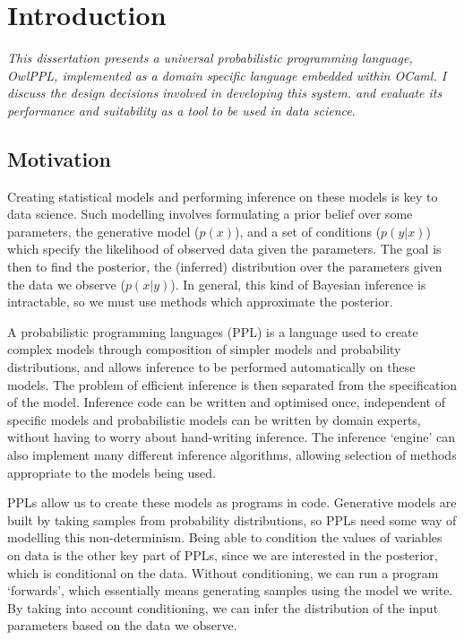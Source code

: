 \chapter{Introduction}

\textit{This dissertation presents a universal probabilistic programming language, OwlPPL, implemented as a domain specific language embedded within OCaml. I discuss the design decisions involved in developing this system. and evaluate its performance and suitability as a tool to be used in data science}.

\section{Motivation}
Creating statistical models and performing inference on these models is key to data science. Such modelling involves formulating a prior belief over some parameters, the generative model ($p(x)$), and a set of conditions ($p(y|x)$) which specify the likelihood of observed data given the parameters. The goal is then to find the posterior, the (inferred) distribution over the parameters given the data we observe ($p(x|y)$). In general, this kind of Bayesian inference is intractable, so we must use methods which approximate the posterior.

A probabilistic programming languages (PPL) is a language used to create complex models through composition of simpler models and probability distributions, and allows inference to be performed automatically on these models. The problem of efficient inference is then separated from the specification of the model. Inference code can be written and optimised once, independent of specific models and probabilistic models can be written by domain experts, without having to worry about hand-writing inference. The inference `engine' can also implement many different inference algorithms, allowing selection of methods appropriate to the models being used.

PPLs allow us to create these models as programs in code. Generative models are built by taking samples from probability distributions, so PPLs need some way of modelling this non-determinism. Being able to condition the values of variables on data is the other key part of PPLs, since we are interested in the posterior, which is conditional on the data. Without conditioning, we can run a program `forwards', which essentially means generating samples using the model we write. By taking into account conditioning, we can infer the distribution of the input parameters based on the data we observe.

